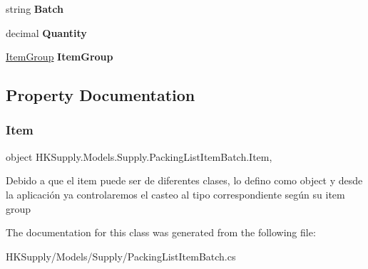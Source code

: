 \begin{DoxyCompactItemize}
string {\bfseries Batch}
\item 
\mbox{\label{class_h_k_supply_1_1_models_1_1_supply_1_1_packing_list_item_batch_afd564e1755b6ffd50b0effbeba96c67c}} 
decimal {\bfseries Quantity}
\item 
\mbox{\label{class_h_k_supply_1_1_models_1_1_supply_1_1_packing_list_item_batch_a15bf9799f71633ea5c8901d0904f7abe}} 
\mbox{\hyperlink{class_h_k_supply_1_1_models_1_1_item_group}{Item\+Group}} {\bfseries Item\+Group}
\end{DoxyCompactItemize}


\subsection{Property Documentation}
\mbox{\label{class_h_k_supply_1_1_models_1_1_supply_1_1_packing_list_item_batch_a772eacdcacf8943effe8b183466553a1}} 
\subsubsection{\texorpdfstring{Item}{Item}}
{\footnotesize\ttfamily object H\+K\+Supply.\+Models.\+Supply.\+Packing\+List\+Item\+Batch.\+Item\hspace{0.3cm}{\ttfamily [get]}, {\ttfamily [set]}}



Debido a que el item puede ser de diferentes clases, lo defino como object y desde la aplicación ya controlaremos el casteo al tipo correspondiente según su item group 



The documentation for this class was generated from the following file\+:\begin{DoxyCompactItemize}
\item 
H\+K\+Supply/\+Models/\+Supply/Packing\+List\+Item\+Batch.\+cs\end{DoxyCompactItemize}
